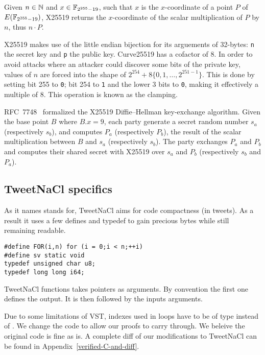 Given $n \in \mathbb{N}$ and $x \in \mathbb{F}_{2^{255}-19}$, such that $x$ is the $x$-coordinate of
a point $P$ of $E(\mathbb{F}_{2^{255}-19})$, X25519 returns the $x$-coordinate of the
scalar multiplication of $P$ by $n$, thus $n \cdot P$.

X25519 makes use of the little endian bijection for its arguements of 32-bytes:
\texttt{n} the secret key and \texttt{p} the public key.
Curve25519 has a cofactor of 8. In order to avoid attacks where an attacker
could discover some bits of the private key, values of $n$ are forced into the
shape of $2^{254} + 8\{0,1,\ldots,2^{251-1}\}$. This is done by setting bit 255
to \texttt{0}; bit 254 to \texttt{1} and the lower 3 bits to \texttt{0},
making it effectively a multiple of 8. This operation is known as the clamping.

RFC~7748~\cite{rfc7748} formalized the X25519 Diffie–Hellman key-exchange algorithm.
Given the base point $B$ where $B.x=9$, each party generate a secret random number
$s_a$ (respectively $s_b$), and computes $P_a$ (respectively $P_b$), the result
of the scalar multiplication between $B$ and $s_a$ (respectively $s_b$).
The party exchanges $P_a$ and $P_b$ and computes their shared secret with X25519
over $s_a$ and $P_b$ (respectively $s_b$ and $P_a$).

\subsection{TweetNaCl specifics}
\label{preliminaries:B}

As it names stands for, TweetNaCl aims for code compactness (in tweets).
As a result it uses a few defines and typedef to gain precious bytes while
still remaining readable.
\begin{lstlisting}[language=Ctweetnacl]
#define FOR(i,n) for (i = 0;i < n;++i)
#define sv static void
typedef unsigned char u8;
typedef long long i64;
\end{lstlisting}

TweetNaCl functions takes pointers as arguments. By convention the first one
defines the output. It is then followed by the inputs arguments.

Due to some limitations of VST, indexes used in  loops have to be
of type  instead of . We change the code to allow our
proofs to carry through. We beleive the original code is fine as is.
A complete diff of our modifications to TweetNaCl can be found in
Appendix~\ref{verified-C-and-diff}.

